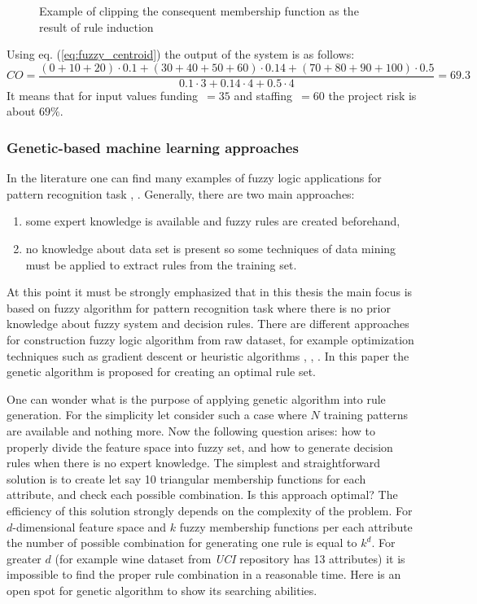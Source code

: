 \begin{enumerate}
\begin{figure}[H]
\begin{center}
            \end{center}
            \caption{Example of clipping the consequent membership function
            as the result of rule induction}
            \label{fig:fuzzy_centroid}
        \end{figure}
        Using eq. (\ref{eq:fuzzy_centroid}) the output of the system is as follows:
        $$
        CO = \frac{(0+10+20)\cdot 0.1 + (30+40+50+60)\cdot 0.14 + (70 + 80 + 90
        + 100)\cdot 0.5}{0.1\cdot 3 + 0.14\cdot 4 + 0.5\cdot 4 } = 69.3
        $$
    It means that for input values funding~$=35$ and staffing~$=60$ the project
    risk is about $69\%$.
\end{enumerate}
\subsubsection{Genetic-based machine learning approaches}
In the literature one can find many examples of fuzzy logic
applications for pattern recognition task \cite{bib3}, \cite{bib9}.
Generally, there are two main approaches:
\begin{enumerate}
    \item some expert knowledge is available and fuzzy rules are created
        beforehand,
    \item no knowledge about data set is present so some techniques of data
        mining must be applied to extract rules from the training set.
\end{enumerate}
At this point it must be strongly emphasized that in this thesis the main focus is based on
fuzzy algorithm for pattern recognition task where there is no prior knowledge 
about fuzzy system and decision rules. There are different approaches for
construction fuzzy logic algorithm from raw dataset, for example optimization techniques
such as gradient descent or heuristic algorithms \cite{bib8}, \cite{bib16},
\cite{bib28}. In this paper the genetic algorithm
is proposed for creating an optimal rule set. 

One can wonder what is the purpose of applying genetic algorithm into rule
generation. For the simplicity let consider such a case where $N$ training
patterns are available and nothing more. Now the following question arises: 
how to properly divide the feature space into fuzzy set, and how to generate
decision rules when there is no expert knowledge. The simplest and
straightforward solution is to create let say 10 triangular membership functions for each
attribute, and check each possible combination. Is this approach optimal? The
efficiency of this solution strongly depends on the complexity of the problem.
For $d$-dimensional feature space and $k$ fuzzy membership functions per each attribute
the number of possible combination for generating one rule is equal to $k^d$.
For greater $d$ (for example wine dataset from \textit{UCI} repository has 13
attributes) it is impossible to find the proper rule combination in a reasonable
time. Here is an open spot for genetic algorithm to show its searching
abilities.


